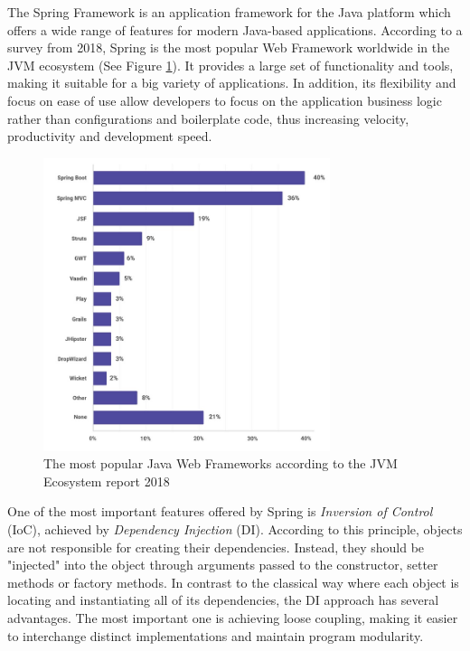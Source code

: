 The Spring Framework is an application framework for the Java platform which offers a wide range of features for modern Java-based applications. According to a survey from 2018, Spring is the most popular Web Framework worldwide in the JVM ecosystem (See Figure \ref{javaWebFrameworksTrendsImg}). It provides a large set of functionality and tools, making it suitable for a big variety of applications. In addition, its flexibility and focus on ease of use allow developers to focus on the application business logic rather than configurations and boilerplate code, thus increasing velocity, productivity and development speed.

\begin{figure}[H]
  \centering
  \includegraphics[width=3.3in]{images/javaWebFrameworksTrends}
  \caption[The most popular Java Web Frameworks according to the JVM Ecosystem report 2018]{The most popular Java Web Frameworks according to the JVM Ecosystem report 2018 \footnotemark}
  \label{javaWebFrameworksTrendsImg}
\end{figure}

One of the most important features offered by Spring is \textit{Inversion of Control} (IoC), achieved by \textit{Dependency Injection} (DI). According to this principle, objects are not responsible for creating their dependencies. Instead, they should be "injected" into the object through arguments passed to the constructor, setter methods or factory methods. In contrast to the classical way where each object is locating and instantiating all of its dependencies, the DI approach has several advantages. The most important one is achieving loose coupling, making it easier to interchange distinct implementations and maintain program modularity.

